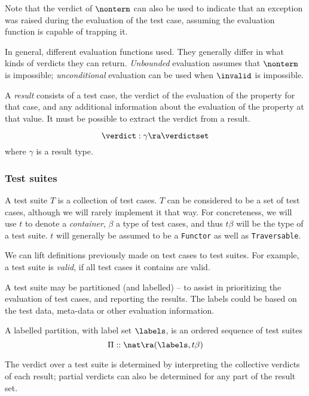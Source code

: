 Note that the verdict of $\nonterm$ can also be used to indicate that an
exception was raised during the evaluation of the test case,
assuming the evaluation function is capable of trapping it.

In general, different evaluation functions used.  They generally differ
in what kinds of verdicts they can return.  \emph{Unbounded} evaluation
assumes that $\nonterm$ is impossible; \emph{unconditional} evaluation
can be used when $\invalid$ is impossible.  

A \emph{result} consists of a test case, the verdict of the evaluation of the
property for that case, and any additional information about the evaluation of
the property at that value.  It must be possible to extract the verdict from
a result.

\begin{df}
$$\verdict : \gamma \ra \verdictset$$
\noindent where $\gamma$ is a result type.
\end{df}

\subsubsection{Test suites}

A test suite $T$ is a collection of test cases.  $T$ can be 
considered to be a set of test cases, although we will rarely 
implement it that way.  For concreteness, we will use $t$ to
denote a \emph{container}, $\beta$ a type of test cases, 
and thus $t \beta$ will be the type of a test suite.  $t$
will generally be assumed to be a \texttt{Functor} as well
as \texttt{Traversable}.

We can lift definitions previously made on test cases to test suites.
For example, a test suite is \emph{valid}, if all test cases it contains
are valid.

A test suite may be partitioned (and labelled) -- to 
assist in prioritizing the evaluation of test cases, and reporting the results.
The labels could be based on the test data, meta-data or 
other evaluation information.

\begin{df}
A labelled partition, with label set $\labels$, is an ordered sequence of test suites
$$ \Pi :: \nat \ra (\labels, t \beta)$$
\end{df}
\noindent
 
The verdict over a test suite is determined by interpreting the collective
verdicts of each result; partial verdicts can also be determined for any part
of the result set.

